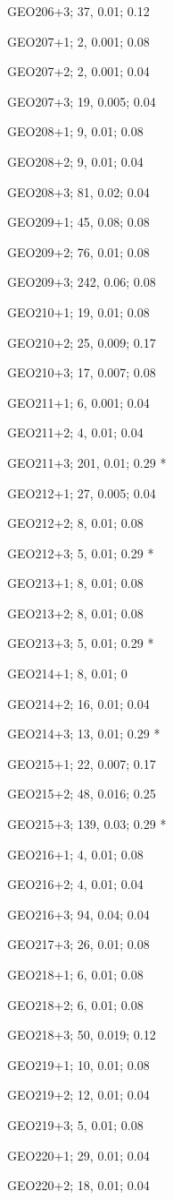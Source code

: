 GEO206+3; 37, 0.01; 0.12

GEO207+1; 2, 0.001; 0.08

GEO207+2; 2, 0.001; 0.04

GEO207+3; 19, 0.005; 0.04

GEO208+1; 9, 0.01; 0.08

GEO208+2; 9, 0.01; 0.04

GEO208+3; 81, 0.02; 0.04

GEO209+1; 45, 0.08; 0.08 

GEO209+2; 76, 0.01; 0.08

GEO209+3; 242, 0.06; 0.08

GEO210+1; 19, 0.01; 0.08

GEO210+2; 25, 0.009; 0.17

GEO210+3; 17, 0.007; 0.08

GEO211+1; 6, 0.001; 0.04

GEO211+2; 4, 0.01; 0.04

GEO211+3; 201, 0.01; 0.29 *

GEO212+1; 27, 0.005; 0.04

GEO212+2; 8, 0.01; 0.08

GEO212+3; 5, 0.01; 0.29 *

GEO213+1; 8, 0.01; 0.08

GEO213+2; 8, 0.01; 0.08

GEO213+3; 5, 0.01; 0.29 *

GEO214+1; 8, 0.01; 0

GEO214+2; 16, 0.01; 0.04

GEO214+3; 13, 0.01; 0.29 *

GEO215+1; 22, 0.007; 0.17

GEO215+2; 48, 0.016; 0.25

GEO215+3; 139, 0.03; 0.29 *

GEO216+1; 4, 0.01; 0.08

GEO216+2; 4, 0.01; 0.04

GEO216+3; 94, 0.04; 0.04

GEO217+3; 26, 0.01; 0.08

GEO218+1; 6, 0.01; 0.08

GEO218+2; 6, 0.01; 0.08

GEO218+3; 50, 0.019; 0.12

GEO219+1; 10, 0.01; 0.08

GEO219+2; 12, 0.01; 0.04

GEO219+3; 5, 0.01; 0.08

GEO220+1; 29, 0.01; 0.04

GEO220+2; 18, 0.01; 0.04

